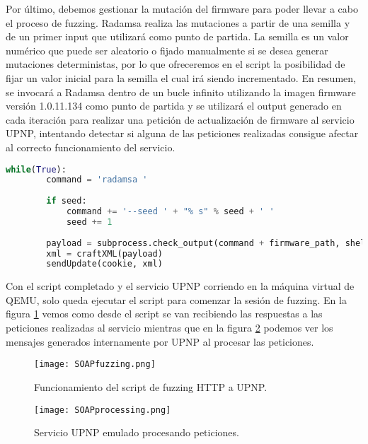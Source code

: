 Por último, debemos gestionar la mutación del firmware para poder llevar a cabo el proceso de fuzzing. Radamsa realiza las 
mutaciones a partir de una semilla y de un primer input que utilizará como punto de partida. La semilla es un valor numérico 
que puede ser aleatorio o fijado manualmente si se desea generar mutaciones deterministas, por lo que ofreceremos en 
el script la posibilidad de fijar un valor inicial para la semilla el cual irá siendo incrementado. En resumen, se invocará
a Radamsa dentro de un bucle infinito utilizando la imagen firmware versión 1.0.11.134 como punto de partida y se utilizará 
el output generado en cada iteración para realizar una petición de actualización de firmware al servicio UPNP, intentando 
detectar si alguna de las peticiones realizadas consigue afectar al correcto funcionamiento del servicio.

\begin{lstlisting}[language=python, caption=Integración con Radamsa para mutación de inputs., captionpos=b,
    frame=single, breaklines, showstringspaces=false]
    while(True):
        command = 'radamsa '
        
        if seed:
            command += '--seed ' + "% s" % seed + ' '
            seed += 1
        
        payload = subprocess.check_output(command + firmware_path, shell=True)
        xml = craftXML(payload)
        sendUpdate(cookie, xml)
\end{lstlisting}

Con el script completado y el servicio UPNP corriendo en la máquina virtual de QEMU, solo queda ejecutar el script para 
comenzar la sesión de fuzzing. En la figura \ref{fig:SOAPfuzzing} vemos como desde el script se van recibiendo las respuestas a las peticiones 
realizadas al servicio mientras que en la figura \ref{fig:SOAPprocessing} podemos ver los mensajes generados internamente por
UPNP al procesar las peticiones.

\begin{figure}[H]
    \centering
    \texttt{[image: SOAPfuzzing.png]}
    \caption{Funcionamiento del script de fuzzing HTTP a UPNP.}
    \label{fig:SOAPfuzzing}
\end{figure}

\begin{figure}[H]
    \centering
    \texttt{[image: SOAPprocessing.png]}
    \caption{Servicio UPNP emulado procesando peticiones.}
    \label{fig:SOAPprocessing}
\end{figure}

